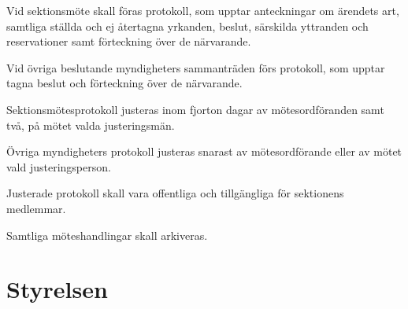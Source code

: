 \documentclass[stadgar]{dsekprotokoll}
\begin{document}
\begin{stadgeavsnitt}


Vid sektionsmöte skall föras protokoll, som upptar anteckningar om ärendets
art, samtliga ställda och ej återtagna yrkanden, beslut, särskilda
yttranden och reservationer samt förteckning över de närvarande.


Vid övriga beslutande myndigheters sammanträden förs protokoll, som upptar
tagna beslut och förteckning över de närvarande.


Sektionsmötesprotokoll justeras inom fjorton dagar av mötesordföranden samt två, på mötet valda justeringsmän.

Övriga myndigheters protokoll justeras snarast av mötesordförande eller av mötet vald justeringsperson.


Justerade protokoll skall vara offentliga och tillgängliga för sektionens medlemmar.


Samtliga möteshandlingar skall arkiveras.

\end{stadgeavsnitt}

\section{Styrelsen}
\end{document}

